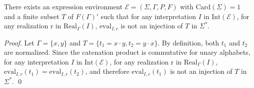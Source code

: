 \documentclass[a4paper]{llncs}
\begin{document}
  
  
  \begin{proposition}
  There exists an expression environment $\mathcal{E}=(\Sigma,\Gamma,P,F)$ with $\mathrm{Card}(\Sigma)=1$ and a finite subset $T$ of $F(\Gamma)'$ such that for any interpretation $I$ in $\mathrm{Int}(\mathcal{E})$, for any realization $\mathrm{r}$ in $\mathrm{Real}_\Gamma(I)$, $\mathrm{eval}_{I,r}$ is not an injection of $T$ in $\Sigma^*$.
  \end{proposition}
  \begin{proof}
    Let $\Gamma=\{x,y\}$ and $T=\{t_1=x\cdot y,t_2=y\cdot x\}$.
    By definition, both $t_1$ and $t_2$ are normalized.
    Since the catenation product is commutative for unary alphabets, for any interpretation $I$ in $\mathrm{Int}(\mathcal{E})$, for any realization $\mathrm{r}$ in $\mathrm{Real}_\Gamma(I)$, $\mathrm{eval}_{I,r}(t_1)=\mathrm{eval}_{I,r}(t_2)$, and therefore $\mathrm{eval}_{I,r}(t_1)$ is not an injection of $T$ in $\Sigma^*$.
  \qed
  \end{proof}
  
\end{document}
